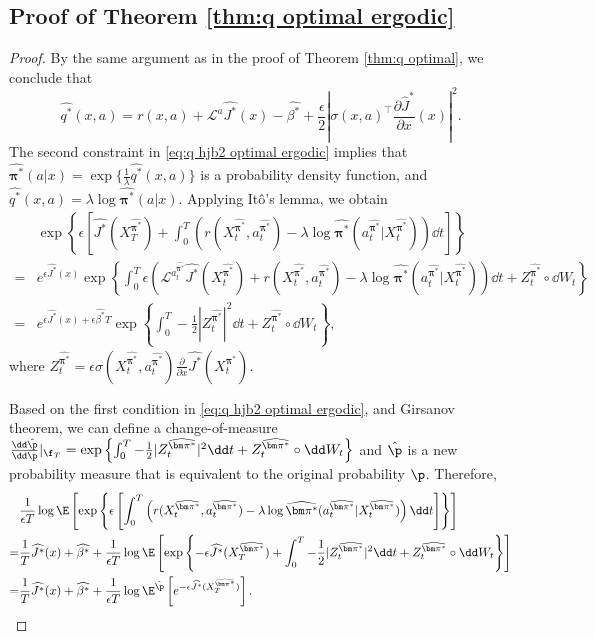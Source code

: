 \subsection{Proof of Theorem \ref{thm:q optimal ergodic}}
\begin{proof}
By the same argument as in the proof of Theorem \ref{thm:q optimal}, we conclude that
\[ \widehat{q^*}(x,a) =  r(x,a) + \mathcal{L}^a \widehat{J^*}(x) - \widehat{\beta^*} + \frac{\epsilon}{2}\left| \sigma(x,a)^\top \frac{\partial \widehat J^*}{\partial x}(x)\right|^2. \]
The second constraint in \eqref{eq:q hjb2 optimal ergodic} implies that $\widehat{\bm\pi^*}(a|x) = \exp\{  \frac{1}{\lambda}\widehat{q^*}(x,a) \}$ is a probability density function, and $\widehat{q^*}(x,a) = \lambda \log\widehat{\bm\pi^*}(a|x)$. Applying It\^o's lemma, we obtain 
\[\begin{aligned}
& \exp\left\{ \epsilon\left[ \widehat{J^*}(X_T^{\widehat{\bm\pi^*}}) + \int_0^T \left(  r(X_t^{\widehat{\bm\pi^*}}, a_t^{\widehat{\bm\pi^*}}) -\lambda \log\widehat{\bm\pi^*}(a_t^{\widehat{\bm\pi^*}} | X_t^{\widehat{\bm\pi^*}})\right)\dd t \right]  \right\} \\
= & e^{\epsilon \widehat{J^*}(x)} \exp\left\{  \int_0^T \epsilon\left( \mathcal{L}^{a_t^{\widehat{\bm\pi^*}}} \widehat{J^*}(X_t^{\widehat{\bm\pi^*}}) +  r(X_t^{\widehat{\bm\pi^*}}, a_t^{\widehat{\bm\pi^*}}) -\lambda \log\widehat{\bm\pi^*}(a_t^{\widehat{\bm\pi^*}} | X_t^{\widehat{\bm\pi^*}})\right)\dd t +  Z_t^{\widehat{\bm\pi^*}} \circ \dd W_t  \right\} \\
= & e^{\epsilon \widehat{J^*}(x) + \epsilon \widehat{\beta^*} T } \exp\left\{  \int_0^T - \frac{1}{2}|Z_t^{\widehat{\bm\pi^*}}|^2  \dd t + Z_t^{\widehat{\bm\pi^*}} \circ \dd W_t  \right\},
\end{aligned}   \]
where $Z_t^{\widehat{\bm\pi^*}} =  \epsilon \sigma(X_t^{\widehat{\bm\pi^*}},a_t^{\widehat{\bm\pi^*}}) \frac{\partial }{\partial x}\widehat{J^*}(X_t^{\widehat{\bm\pi^*}})$.

Based on the first condition in \eqref{eq:q hjb2 optimal ergodic}, and Girsanov theorem, we can define a change-of-measure $\frac{\dd \hat{\p}}{\dd \p}|_{\f_T} = \exp\left\{  \int_0^T - \frac{1}{2}|Z_t^{\widehat{\bm\pi^*}}|^2  \dd t + Z_t^{\widehat{\bm\pi^*}} \circ \dd W_t  \right\}$ and $\hat\p$ is a new probability measure that is equivalent to the original probability $\p$. Therefore,
\[\begin{aligned}
& \frac{1}{\epsilon T} \log \E\left[ \exp\left\{ \epsilon\left[  \int_0^T \left(  r(X_t^{\widehat{\bm\pi^*}}, a_t^{\widehat{\bm\pi^*}}) -\lambda \log\widehat{\bm\pi^*}(a_t^{\widehat{\bm\pi^*}} | X_t^{\widehat{\bm\pi^*}})\right)\dd t \right]  \right\} \right] \\
= & \frac{1}{T} \widehat{J^*}(x) + \widehat{\beta^*} + \frac{1}{\epsilon T} \log \E\left[ \exp\left\{ -\epsilon \widehat{J^*}(X_T^{\widehat{\bm\pi^*}}) +  \int_0^T - \frac{1}{2}|Z_t^{\widehat{\bm\pi^*}}|^2  \dd t + Z_t^{\widehat{\bm\pi^*}} \circ \dd W_t   \right\}  \right] \\
= & \frac{1}{T} \widehat{J^*}(x) + \widehat{\beta^*} + \frac{1}{\epsilon T} \log\E^{\hat\p}\left[ e^{-\epsilon \widehat{J^*}(X_T^{\widehat{\bm\pi^*}}) } \right]. 
\end{aligned}  \]


\end{proof}
